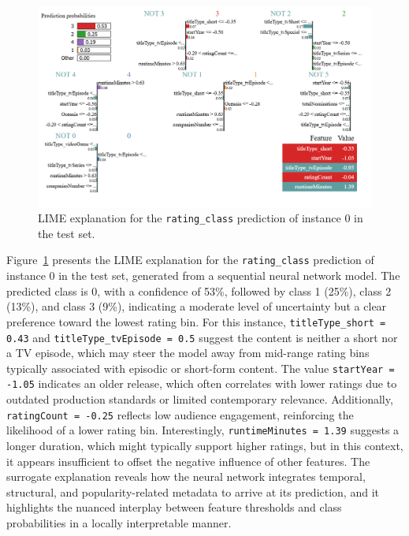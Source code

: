 \begin{figure}[htbp]
    \centering
    \includegraphics[width=\linewidth]{plotsss/Lime_rating.png}
    \caption{LIME explanation for the \texttt{rating\_class} prediction of instance 0 in the test set.}
    \label{fig:LIME_rating}
\end{figure}

Figure~\ref{fig:LIME_rating} presents the LIME explanation for the \texttt{rating\_class} 
prediction of instance 0 in the test set, generated from a sequential neural network model. 
The predicted class is 0, with a confidence of 53\%, followed by class 1 (25\%), class 2 (13\%), and class 3 (9\%), 
indicating a moderate level of uncertainty but a clear preference toward the lowest rating bin. 
For this instance, \texttt{titleType\_short = 0.43} and \texttt{titleType\_tvEpisode = 0.5} suggest the content 
is neither a short nor a TV episode, which may steer the model away from mid-range rating bins typically 
associated with episodic or short-form content. The value \texttt{startYear = -1.05} indicates an older release, 
which often correlates with lower ratings due to outdated production standards or limited contemporary relevance. 
Additionally, \texttt{ratingCount = -0.25} reflects low audience engagement, reinforcing the likelihood of a 
lower rating bin. Interestingly, \texttt{runtimeMinutes = 1.39} suggests a longer duration, which might typically 
support higher ratings, but in this context, it appears insufficient to offset the negative influence of other 
features. The surrogate explanation reveals how the neural network integrates temporal, structural, and 
popularity-related metadata to arrive at its prediction, and it highlights the nuanced interplay 
between feature thresholds and class probabilities in a locally interpretable manner.

